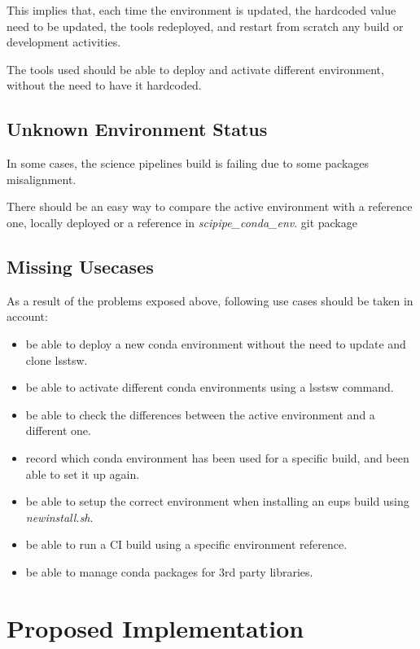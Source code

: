 This implies that, each time the environment is updated, the hardcoded value need to be updated, the tools redeployed, and restart from scratch any build or development activities.

The tools used should be able to deploy and activate different environment, without the need to have it hardcoded.


\subsection{Unknown Environment Status} \label{sec:unknown}

In some cases, the science pipelines build is failing due to some packages misalignment.

There should be an easy way to compare the active environment  with a reference one, locally deployed or a reference in \textit{scipipe\_conda\_env}. git package 


\subsection{Missing Usecases}

As a result of the problems exposed above, following use cases should be taken in account:

\begin{itemize}
\item be able to deploy a new conda environment without the need to update and clone lsstsw.
\item be able to activate different conda environments using a lsstsw command.
\item be able to check the differences between the active environment and a different one.
\item record which conda environment has been used for a specific build, and been able to set it up again.
\item be able to setup the correct environment when installing an eups build using \textit{newinstall.sh}.
\item be able to run a CI build using a specific environment reference.
\item be able to manage conda packages for 3rd party libraries.
\end{itemize}


\newpage
\section{Proposed Implementation} \label{sec:proposed}

